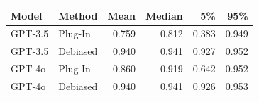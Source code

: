 
\begin{tabular}{llrrrr}
\toprule
Model & Method & Mean & Median & 5\% & 95\%\\
\midrule
GPT-3.5 & Plug-In & 0.759 & 0.812 & 0.383 & 0.949\\
GPT-3.5 & Debiased & 0.940 & 0.941 & 0.927 & 0.952\\
\midrule
GPT-4o & Plug-In & 0.860 & 0.919 & 0.642 & 0.952\\
GPT-4o & Debiased & 0.940 & 0.941 & 0.926 & 0.953\\
\bottomrule
\end{tabular}
